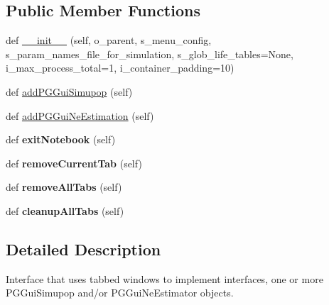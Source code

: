 \subsection*{Public Member Functions}
\begin{DoxyCompactItemize}
\item 
def \hyperlink{classnegui_1_1pghostnotebook_1_1PGHostNotebook_a794d9f85a01b49d76c1170c67e5eb57e}{\+\_\+\+\_\+init\+\_\+\+\_\+} (self, o\+\_\+parent, s\+\_\+menu\+\_\+config, s\+\_\+param\+\_\+names\+\_\+file\+\_\+for\+\_\+simulation, s\+\_\+glob\+\_\+life\+\_\+tables=None, i\+\_\+max\+\_\+process\+\_\+total=1, i\+\_\+container\+\_\+padding=10)
\item 
def \hyperlink{classnegui_1_1pghostnotebook_1_1PGHostNotebook_af595ed4592e623ef403a5e9e7c1e930e}{add\+P\+G\+Gui\+Simupop} (self)
\item 
def \hyperlink{classnegui_1_1pghostnotebook_1_1PGHostNotebook_a9242f6b6eff030ac5de8db425e1585f9}{add\+P\+G\+Gui\+Ne\+Estimation} (self)
\item 
def {\bfseries exit\+Notebook} (self)\hypertarget{classnegui_1_1pghostnotebook_1_1PGHostNotebook_a6b399a4627a80141332553e637eab595}{}\label{classnegui_1_1pghostnotebook_1_1PGHostNotebook_a6b399a4627a80141332553e637eab595}

\item 
def {\bfseries remove\+Current\+Tab} (self)\hypertarget{classnegui_1_1pghostnotebook_1_1PGHostNotebook_a722efece7ca42a910310c05dd77a282b}{}\label{classnegui_1_1pghostnotebook_1_1PGHostNotebook_a722efece7ca42a910310c05dd77a282b}

\item 
def {\bfseries remove\+All\+Tabs} (self)\hypertarget{classnegui_1_1pghostnotebook_1_1PGHostNotebook_a1ee591325aa0128d47f46b9faf5ebf9a}{}\label{classnegui_1_1pghostnotebook_1_1PGHostNotebook_a1ee591325aa0128d47f46b9faf5ebf9a}

\item 
def {\bfseries cleanup\+All\+Tabs} (self)\hypertarget{classnegui_1_1pghostnotebook_1_1PGHostNotebook_a78f874aa3ad33e4287dfca4cf23e54f1}{}\label{classnegui_1_1pghostnotebook_1_1PGHostNotebook_a78f874aa3ad33e4287dfca4cf23e54f1}

\end{DoxyCompactItemize}


\subsection{Detailed Description}
\begin{DoxyVerb}Interface that uses tabbed windows to implement interfaces, one or more PGGuiSimupop and/or PGGuiNeEstimator
objects.
\end{DoxyVerb}
 

